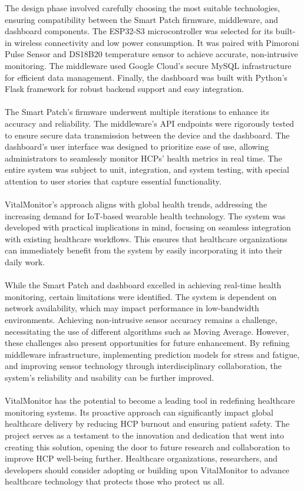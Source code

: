 The design phase involved carefully choosing the most suitable technologies, ensuring compatibility between the Smart Patch firmware, middleware, and dashboard components. The ESP32-S3 microcontroller was selected for its built-in wireless connectivity and low power consumption. It was paired with Pimoroni Pulse Sensor and DS18B20 temperature sensor to achieve accurate, non-intrusive monitoring. The middleware used Google Cloud's secure MySQL infrastructure for efficient data management. Finally, the dashboard was built with Python's Flask framework for robust backend support and easy integration.\\ \\ 
The Smart Patch's firmware underwent multiple iterations to enhance its accuracy and reliability. The middleware's API endpoints were rigorously tested to ensure secure data transmission between the device and the dashboard. The dashboard's user interface was designed to prioritize ease of use, allowing administrators to seamlessly monitor HCPs' health metrics in real time. The entire system was subject to unit, integration, and system testing, with special attention to user stories that capture essential functionality. \\ \\ 
VitalMonitor's approach aligns with global health trends, addressing the increasing demand for IoT-based wearable health technology. The system was developed with practical implications in mind, focusing on seamless integration with existing healthcare workflows. This ensures that healthcare organizations can immediately benefit from the system by easily incorporating it into their daily work. \\ \\
While the Smart Patch and dashboard excelled in achieving real-time health monitoring, certain limitations were identified. The system is dependent on network availability, which may impact performance in low-bandwidth environments. Achieving non-intrusive sensor accuracy remains a challenge, necessitating the use of different algorithms such as Moving Average. However, these challenges also present opportunities for future enhancement. By refining middleware infrastructure, implementing prediction models for stress and fatigue, and improving sensor technology through interdisciplinary collaboration, the system's reliability and usability can be further improved.\\ \\
VitalMonitor has the potential to become a leading tool in redefining healthcare monitoring systems. Its proactive approach can significantly impact global healthcare delivery by reducing HCP burnout and ensuring patient safety. The project serves as a testament to the innovation and dedication that went into creating this solution, opening the door to future research and collaboration to improve HCP well-being further. Healthcare organizations, researchers, and developers should consider adopting or building upon VitalMonitor to advance healthcare technology that protects those who protect us all. 